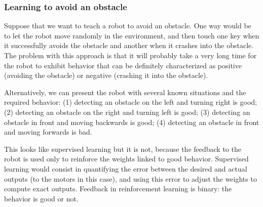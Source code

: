 \subsubsection*{Learning to avoid an obstacle}

Suppose that we want to teach a robot to avoid an obstacle. One way would be to let the robot move randomly in the environment, and then touch one key when it successfully avoids the obstacle and another when it crashes into the obstacle. The problem with this approach is that it will probably take a very long time for the robot to exhibit behavior that can be definitely characterized as positive (avoiding the obstacle) or negative (crashing it into the obstacle).

Alternatively, we can present the robot with several known situations and the required behavior: (1) detecting an obstacle on the left and turning right is good; (2) detecting an obstacle on the right and turning left is good; (3) detecting an obstacle in front and moving backwards is good; (4) detecting an obstacle in front and moving forwards is bad.

This looks like supervised learning but it is not, because the feedback to the robot is used only to reinforce the weights linked to good behavior. Supervised learning would consist in quantifying the error between the desired and actual outputs (to the motors in this case), and using this error to adjust the weights to compute exact outputs. Feedback in reinforcement learning is binary: the behavior is good or not.

